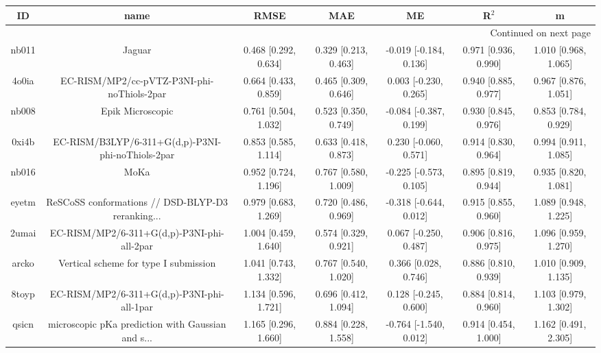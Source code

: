 \documentclass{article}
\begin{document}
\begin{center}
\begin{longtable}{|ccccccc|}
\toprule
    ID &                                               name &                  RMSE &                   MAE &                      ME &                 R$^2$ &                     m \\
\midrule
\endhead
\midrule
\multicolumn{7}{r}{{Continued on next page}} \\
\midrule
\endfoot

\bottomrule
\endlastfoot
 nb011 &                                             Jaguar &  0.468 [0.292, 0.634] &  0.329 [0.213, 0.463] &  -0.019 [-0.184, 0.136] &  0.971 [0.936, 0.990] &  1.010 [0.968, 1.065] \\
 4o0ia &         EC-RISM/MP2/cc-pVTZ-P3NI-phi-noThiols-2par &  0.664 [0.433, 0.859] &  0.465 [0.309, 0.646] &   0.003 [-0.230, 0.265] &  0.940 [0.885, 0.977] &  0.967 [0.876, 1.051] \\
 nb008 &                                   Epik Microscopic &  0.761 [0.504, 1.032] &  0.523 [0.350, 0.749] &  -0.084 [-0.387, 0.199] &  0.930 [0.845, 0.976] &  0.853 [0.784, 0.929] \\
 0xi4b &  EC-RISM/B3LYP/6-311+G(d,p)-P3NI-phi-noThiols-2par &  0.853 [0.585, 1.114] &  0.633 [0.418, 0.873] &   0.230 [-0.060, 0.571] &  0.914 [0.830, 0.964] &  0.994 [0.911, 1.085] \\
 nb016 &                                               MoKa &  0.952 [0.724, 1.196] &  0.767 [0.580, 1.009] &  -0.225 [-0.573, 0.105] &  0.895 [0.819, 0.944] &  0.935 [0.820, 1.081] \\
 eyetm &  ReSCoSS conformations // DSD-BLYP-D3 reranking... &  0.979 [0.683, 1.269] &  0.720 [0.486, 0.969] &  -0.318 [-0.644, 0.012] &  0.915 [0.855, 0.960] &  1.089 [0.948, 1.225] \\
 2umai &         EC-RISM/MP2/6-311+G(d,p)-P3NI-phi-all-2par &  1.004 [0.459, 1.640] &  0.574 [0.329, 0.921] &   0.067 [-0.250, 0.487] &  0.906 [0.816, 0.975] &  1.096 [0.959, 1.270] \\
 arcko &              Vertical scheme for type I submission &  1.041 [0.743, 1.332] &  0.767 [0.540, 1.020] &    0.366 [0.028, 0.746] &  0.886 [0.810, 0.939] &  1.010 [0.909, 1.135] \\
 8toyp &         EC-RISM/MP2/6-311+G(d,p)-P3NI-phi-all-1par &  1.134 [0.596, 1.721] &  0.696 [0.412, 1.094] &   0.128 [-0.245, 0.600] &  0.884 [0.814, 0.960] &  1.103 [0.979, 1.302] \\
 qsicn &  microscopic pKa prediction with Gaussian and s... &  1.165 [0.296, 1.660] &  0.884 [0.228, 1.558] &  -0.764 [-1.540, 0.012] &  0.914 [0.454, 1.000] &  1.162 [0.491, 2.305] \\

\end{longtable}
\end{center}
\end{document}
